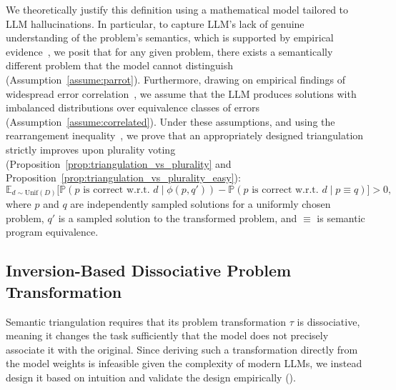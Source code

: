 \documentclass[acmsmall,screen,nonacm]{acmart}
\begin{document}
We theoretically justify this definition using a mathematical model tailored to LLM hallucinations. In particular, to capture LLM's lack of genuine understanding of the problem's semantics, which is supported by empirical evidence~\cite{bender2021dangers,shani2025tokens}, we posit that for any given problem, there exists a semantically different problem that the model cannot distinguish (Assumption~\ref{assume:parrot}). Furthermore, drawing on empirical findings of widespread error correlation~\cite{kim2025correlated}, we assume that the LLM produces solutions with imbalanced distributions over equivalence classes of errors (Assumption~\ref{assume:correlated}). Under these assumptions, and using the rearrangement inequality~\cite{hardy1952inequalities}, we prove that an appropriately designed triangulation strictly improves upon plurality voting (Proposition~\ref{prop:triangulation_vs_plurality} and Proposition~\ref{prop:triangulation_vs_plurality_easy}):
\begin{equation*}
\mathds{E}_{d\sim\mathrm{Unif}(D)} \bigl[ \mathds{P}(p\text{ is correct w.r.t. }d \mid \phi(p, q')) - \mathds{P}(p \text{ is correct w.r.t. }d \mid p \equiv q) \bigr] > 0,
\end{equation*}
where $p$ and $q$ are independently sampled solutions for a uniformly chosen problem, $q'$ is a sampled solution to the transformed problem, and $\equiv$ is semantic program equivalence.

\subsection{Inversion-Based Dissociative Problem Transformation}
\label{sec:enum_sinv_example}

Semantic triangulation requires that its problem transformation $\tau$ is dissociative, meaning it changes the task sufficiently that the model does not precisely associate it with the original. Since deriving such a transformation directly from the model weights is infeasible given the complexity of modern LLMs, we instead design it based on intuition and validate the design empirically ().


\end{document}
